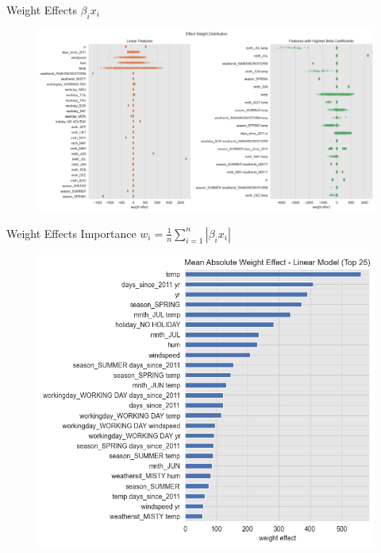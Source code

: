 \documentclass[10pt]{beamer}
\begin{document}
\begin{frame}{Weight Effects $\beta_{i}x_{i}$}
\begin{center}
  \begin{figure}
    \includegraphics[scale=0.3]{images/interpretable_ml_61_0.png}
  \end{figure}
\end{center}
\end{frame}

\begin{frame}{Weight Effects Importance $w_{i} = \frac{1}{n}\sum_{i=1}^{n}|\beta_{i}x_{i}|$}
\begin{center}
  \begin{figure}
    \includegraphics[scale=0.45]{images/interpretable_ml_62_0.png}
  \end{figure}
\end{center}
\end{frame}
\end{document}
